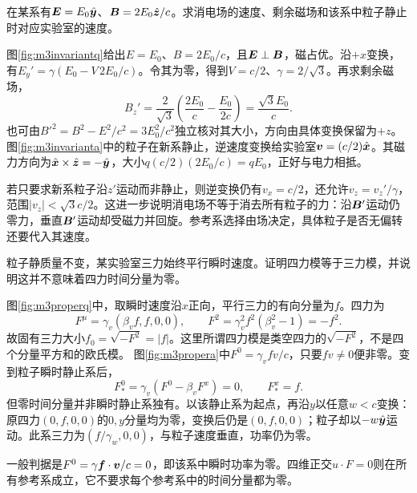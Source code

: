 \begin{exercise}\label{ex:m3invariantfields}
在某系有$\bm{E}=E_0\hat{\bm{y}}$、$\bm{B}=2E_0\hat{\bm{z}}/c$。求消电场的速度、剩余磁场和该系中粒子静止时对应实验室的速度。
\end{exercise}
\begin{solution}
图\ref{fig:m3invariantq}给出$E=E_0$、$B=2E_0/c$，且$\bm{E}\perp\bm{B}$，磁占优。沿$+x$变换，有$E_y'=\gamma(E_0-V\,2E_0/c)$。令其为零，得到$V=c/2$、$\gamma=2/\sqrt3$。再求剩余磁场，
\[
 B_z'=\frac2{\sqrt3}\left(\frac{2E_0}c-\frac{E_0}{2c}\right)
 =\frac{\sqrt3E_0}c.
\]
也可由$B'^2=B^2-E^2/c^2=3E_0^2/c^2$独立核对其大小，方向由具体变换保留为$+z$。
图\ref{fig:m3invarianta}中的粒子在新系静止，逆速度变换给实验室$\bm{v}=(c/2)\hat{\bm{x}}$。其磁力方向为$\hat{\bm{x}}\times\hat{\bm{z}}=-\hat{\bm{y}}$，大小$q(c/2)(2E_0/c)=qE_0$，正好与电力相抵。

若只要求新系粒子沿$z'$运动而非静止，则逆变换仍有$v_x=c/2$，还允许$v_z=v_z'/\gamma$，范围$|v_z|<\sqrt3c/2$。这进一步说明消电场不等于消去所有粒子的力：沿$\bm{B}'$运动仍零力，垂直$\bm{B}'$运动却受磁力并回旋。参考系选择由场决定，具体粒子是否无偏转还要代入其速度。
\end{solution}

\begin{exercise}\label{ex:m3properpower}
粒子静质量不变，某实验室三力始终平行瞬时速度。证明四力模等于三力模，并说明这并不意味着四力时间分量为零。
\end{exercise}
\begin{solution}
图\ref{fig:m3properq}中，取瞬时速度沿$x$正向，平行三力的有向分量为$f$。四力为
\[
 F^\mu=\gamma_v(\beta_v f,f,0,0),\qquad
 F^2=\gamma_v^2f^2(\beta_v^2-1)=-f^2.
\]
故固有三力大小$f_0=\sqrt{-F^2}=|f|$。这里所谓四力模是类空四力的$\sqrt{-F^2}$，不是四个分量平方和的欧氏模。
图\ref{fig:m3propera}中$F^0=\gamma_vfv/c$，只要$fv\ne0$便非零。变到粒子瞬时静止系后，
\[
 F_*^0=\gamma_v(F^0-\beta_vF^x)=0,\qquad F_*^x=f.
\]
但零时间分量并非瞬时静止系独有。以该静止系为起点，再沿$y$以任意$w<c$变换：原四力$(0,f,0,0)$的$0,y$分量均为零，变换后仍是$(0,f,0,0)$；粒子却以$-w\hat{\bm{y}}$运动。此系三力为$(f/\gamma_w,0,0)$，与粒子速度垂直，功率仍为零。

一般判据是$F^0=\gamma\bm{f}\cdot\bm{v}/c=0$，即该系中瞬时功率为零。四维正交$u\cdot F=0$则在所有参考系成立，它不要求每个参考系中的时间分量都为零。
\end{solution}
